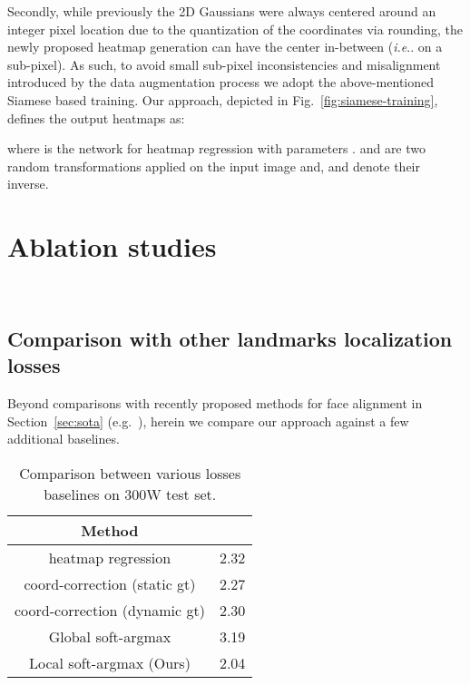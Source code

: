 \documentclass{bmvc2k}
\makeatletter
\DeclareRobustCommand\onedot{\futurelet\@let@token\@onedot}
\def\@onedot{\ifx\@let@token.\else.\null\fi\xspace}
\def\ie{\emph{i.e}\onedot} \def\Ie{\emph{I.e}\onedot}
\makeatother
\begin{document}
Secondly, while previously the 2D Gaussians were always centered around an integer pixel location due to the quantization of the coordinates via rounding, the newly proposed heatmap generation can have the center in-between (\ie on a sub-pixel). As such, to avoid small sub-pixel inconsistencies and misalignment introduced by the data augmentation process we adopt the above-mentioned Siamese based training. Our approach, depicted in Fig.~\ref{fig:siamese-training}, defines the output heatmaps  as: 


where  is the network for heatmap regression with parameters .  and  are two random transformations applied on the input image  and,  and  denote their inverse.
\vspace{-10px}
\section{Ablation studies}~\label{sec:ablation}
\vspace{-30px}

\subsection{Comparison with other landmarks localization losses}\label{ssec:comparison-loss}

Beyond comparisons with recently proposed methods for face alignment in Section~\ref{sec:sota} (e.g.~\cite{feng2018wing,wang2019adaptive,kumar2020luvli}), herein we compare our approach against a few additional baselines.

\begin{wraptable}[12]{r}{0.49\textwidth}
    \vspace{-0.3cm}
    \centering
    \begin{tabular}{cc}
        \toprule
        Method &  \\
        \midrule
          heatmap regression & 2.32\\
         coord-correction (static gt) & 2.27\\
         coord-correction (dynamic gt) & 2.30 \\
         Global soft-argmax & 3.19 \\
         \midrule
         Local soft-argmax (Ours) & 2.04\\
    \bottomrule
    \end{tabular}
        \caption{Comparison between various losses baselines on 300W test set.}
    \label{tab:ablation-loss}
\end{wraptable}
\end{document}

